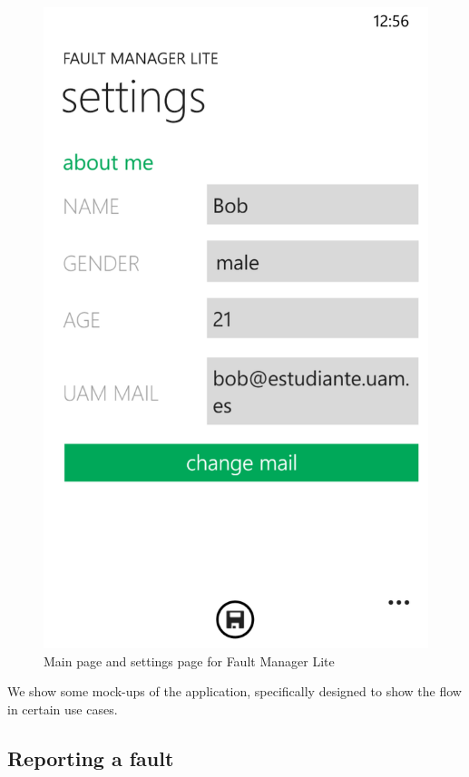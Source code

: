 \documentclass{report}
\begin{document}
\begin{figure}[hbtp]
\begin{minipage}{0.3\textwidth}
\includegraphics[width=\textwidth]{img/Settings.png}
\end{minipage}
\caption{Main page and settings page for Fault Manager Lite}
\label{imgMainPage}
\end{figure}

We show some mock-ups of the application, specifically designed to show the flow in certain use cases.

\subsection{Reporting a fault}
\end{document}
